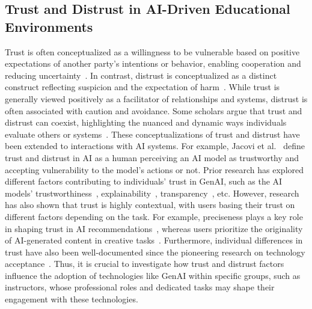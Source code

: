 \subsection{Trust and Distrust in AI-Driven Educational Environments}

Trust is often conceptualized as a willingness to be vulnerable based on positive expectations of another party’s intentions or behavior, enabling cooperation and reducing uncertainty~\cite{mayer1995integrative, dirks2001role}. In contrast, distrust is conceptualized as a distinct construct reflecting suspicion and the expectation of harm~\cite{lewicki1998trust}. While trust is generally viewed positively as a facilitator of relationships and systems, distrust is often associated with caution and avoidance. Some scholars argue that trust and distrust can coexist, highlighting the nuanced and dynamic ways individuals evaluate others or systems~\cite{lewicki1998trust, schilke2021trust}. These conceptualizations of trust and distrust have been extended to interactions with AI systems. For example, Jacovi et al.~\cite{jacovi2021formalizing} define trust and distrust in AI as a human perceiving an AI model as trustworthy and accepting vulnerability to the model's actions or not. Prior research has explored different factors contributing to individuals' trust in GenAI, such as the AI models' trustworthiness~\cite{sun2024trustllm}, explainability~\cite{bhattacharjee2024towards}, transparency~\cite{sarker2024llm}, etc. However, research has also shown that trust is highly contextual, with users basing their trust on different factors depending on the task. For example, preciseness plays a key role in shaping trust in AI recommendations~\cite{kim2021you}, whereas users prioritize the originality of AI-generated content in creative tasks~\cite{daly2024sensemaking}. Furthermore, individual differences in trust have also been well-documented since the pioneering research on technology acceptance~\cite{davis1989perceived, davis1989technology}. Thus, it is crucial to investigate how trust and distrust factors influence the adoption of technologies like GenAI within specific groups, such as instructors, whose professional roles and dedicated tasks may shape their engagement with these technologies.


